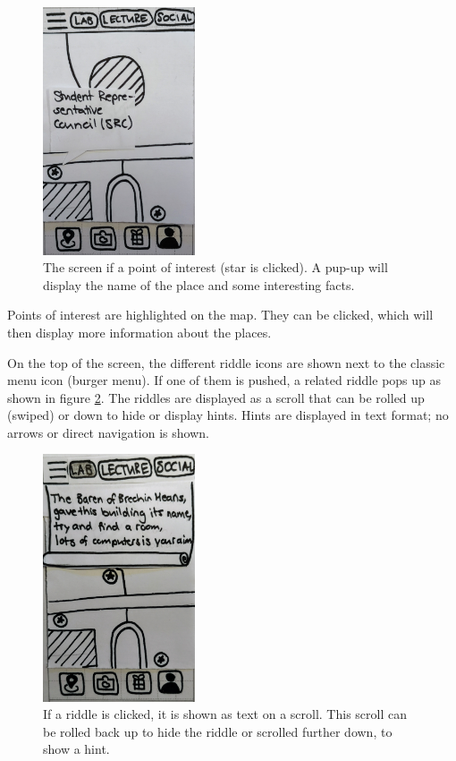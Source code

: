 \documentclass[10pt,twocolumn]{article} %
\begin{document}
\begin{figure}[ht]
\centering
\includegraphics[width=0.4\textwidth]{./figures/map_src.jpg}
\caption{The screen if a point of interest (star is clicked). A pup-up will display the name of the place and some interesting facts.}
\label{fig:map_src}
\end{figure}

Points of interest are highlighted on the map. They can be clicked, which will then display more information about the places.

On the top of the screen, the different riddle icons are shown next to the classic menu icon (burger menu). If one of them is pushed, a related riddle pops up as shown in figure \ref{fig:map_riddle}. The riddles are displayed as a scroll that can be rolled up (swiped) or down to hide or display hints. Hints are displayed in text format; no arrows or direct navigation is shown.

\begin{figure}[ht]
\centering
\includegraphics[width=0.4\textwidth]{./figures/map_riddle.jpg}
\caption{If a riddle is clicked, it is shown as text on a scroll. This scroll can be rolled back up to hide the riddle or scrolled further down, to show a hint.}
\label{fig:map_riddle}
\end{figure}
\end{document}
